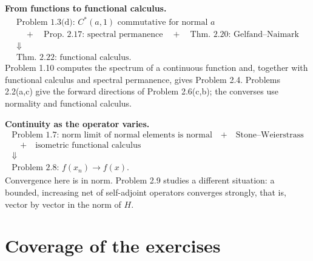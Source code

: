 \begin{dependencias}
\textbf{From functions to functional calculus.}
\[
\begin{gathered}
\boxed{\text{Problem 1.3(d): }C^*(a,1)\text{ commutative for normal $a$}}\\[2mm]
\quad+\quad
\boxed{\text{Prop. 2.17: spectral permanence}}
\quad+\quad
\boxed{\text{Thm. 2.20: Gelfand--Naimark}}\\[2mm]
\Downarrow\\[2mm]
\boxed{\text{Thm. 2.22: functional calculus}}.
\end{gathered}
\]
Problem 1.10 computes the spectrum of a continuous function and, together with functional
calculus and spectral permanence, gives Problem 2.4. Problems 2.2(a,c) give the forward
directions of Problem 2.6(c,b); the converses use normality and functional calculus.
\end{dependencias}

\begin{dependencias}
\textbf{Continuity as the operator varies.}
\[
\begin{gathered}
\boxed{\text{Problem 1.7: norm limit of normal elements is normal}}
\quad+\quad
\boxed{\text{Stone--Weierstrass}}\\[2mm]
\quad+\quad
\boxed{\text{isometric functional calculus}}\\[2mm]
\Downarrow\\[2mm]
\boxed{\text{Problem 2.8: }f(x_n)\to f(x)}.
\end{gathered}
\]
Convergence here is in norm. Problem 2.9 studies a different situation: a bounded,
increasing net of self-adjoint operators converges strongly, that is, vector by vector
in the norm of $H$.
\end{dependencias}

\section{Coverage of the exercises}

